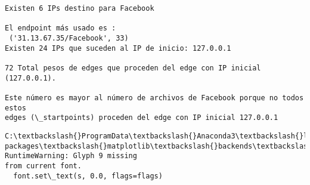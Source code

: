 \documentclass[11pt]{article}
\begin{document}
    \begin{Verbatim}[commandchars=\\\{\}]
Existen 6 IPs destino para Facebook

El endpoint más usado es :
 ('31.13.67.35/Facebook', 33)
Existen 24 IPs que suceden al IP de inicio: 127.0.0.1

72 Total pesos de edges que proceden del edge con IP inicial (127.0.0.1).

Este número es mayor al número de archivos de Facebook porque no todos estos
edges (\_startpoints) proceden del edge con IP inicial 127.0.0.1
    \end{Verbatim}

    \begin{Verbatim}[commandchars=\\\{\}]
C:\textbackslash{}ProgramData\textbackslash{}Anaconda3\textbackslash{}lib\textbackslash{}site-
packages\textbackslash{}matplotlib\textbackslash{}backends\textbackslash{}backend\_agg.py:211: RuntimeWarning: Glyph 9 missing
from current font.
  font.set\_text(s, 0.0, flags=flags)
    \end{Verbatim}

    \begin{center}
    \end{center}
    { \hspace*{\fill} \\}
    
\end{document}
